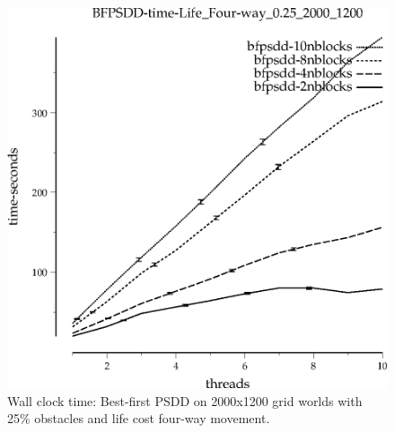 \documentclass{article}
\begin{document}
\begin{appendices}

\begin{figure}[h]
\begin{center}
\includegraphics{../graphs/grid_life_four-way_0.25_2000_1200/BFPSDD-time-Life_Four-way_0.25_2000_1200.eps}
\caption{Wall clock time: Best-first PSDD on 2000x1200 grid worlds with 25\%
  obstacles and life cost four-way movement.}
\end{center}
\end{figure}


\end{appendices}
\end{document}
